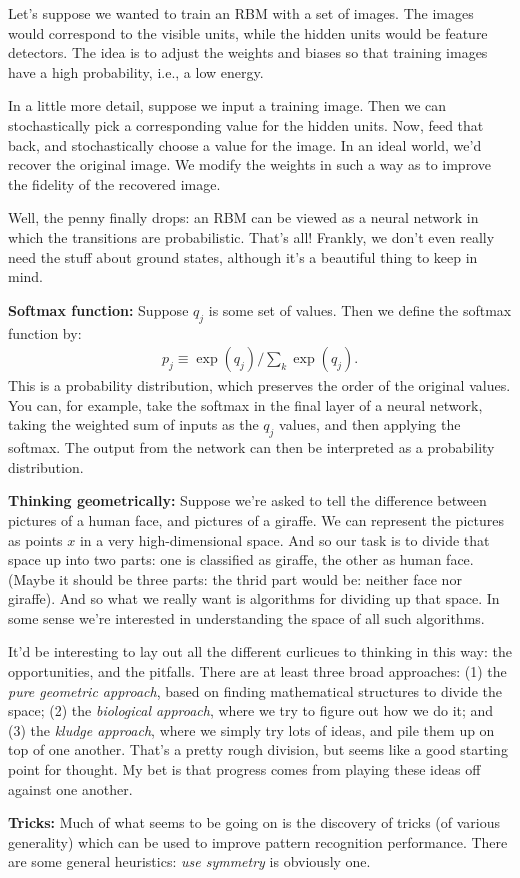 \documentclass[12pt]{report}
\begin{document}
Let's suppose we wanted to train an RBM with a set of images.  The
images would correspond to the visible units, while the hidden units
would be feature detectors.  The idea is to adjust the weights and
biases so that training images have a high probability, i.e., a low
energy.  

In a little more detail, suppose we input a training image.  Then we
can stochastically pick a corresponding value for the hidden units.
Now, feed that back, and stochastically choose a value for the image.
In an ideal world, we'd recover the original image.  We modify the
weights in such a way as to improve the fidelity of the recovered
image.

Well, the penny finally drops: an RBM can be viewed as a neural
network in which the transitions are probabilistic.  That's all!
Frankly, we don't even really need the stuff about ground states,
although it's a beautiful thing to keep in mind.

\textbf{Softmax function:} Suppose $q_j$ is some set of values.  Then
  we define the softmax function by:
\begin{eqnarray}
p_j \equiv \exp(q_j)/\sum_k \exp(q_j).
\end{eqnarray}
This is a probability distribution, which preserves the order of the
original values.  You can, for example, take the softmax in the final
layer of a neural network, taking the weighted sum of inputs as the
$q_j$ values, and then applying the softmax.  The output from the
network can then be interpreted as a probability distribution.

\textbf{Thinking geometrically:} Suppose we're asked to tell the
difference between pictures of a human face, and pictures of a
giraffe.  We can represent the pictures as points $x$ in a very
high-dimensional space.  And so our task is to divide that space up
into two parts: one is classified as giraffe, the other as human face.
(Maybe it should be three parts: the thrid part would be: neither face
nor giraffe).  And so what we really want is algorithms for dividing
up that space.  In some sense we're interested in understanding the
space of all such algorithms. 

It'd be interesting to lay out all the different curlicues to thinking
in this way: the opportunities, and the pitfalls.  There are at least
three broad approaches: (1) the \emph{pure geometric approach}, based
on finding mathematical structures to divide the space; (2) the
\emph{biological approach}, where we try to figure out how we do it;
and (3) the \emph{kludge approach}, where we simply try lots of ideas,
and pile them up on top of one another.  That's a pretty rough
division, but seems like a good starting point for thought.  My bet is
that progress comes from playing these ideas off against one another.

\textbf{Tricks:} Much of what seems to be going on is the discovery of
tricks (of various generality) which can be used to improve pattern
recognition performance.  There are some general heuristics: \emph{use
  symmetry} is obviously one.
\end{document}
